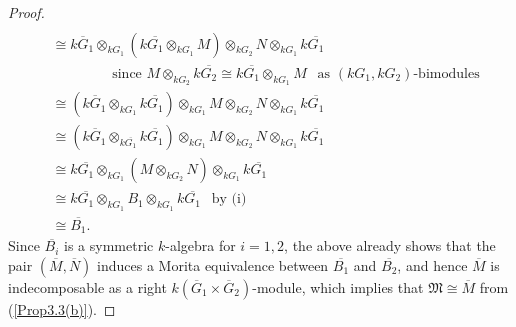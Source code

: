 \documentclass[12pt,a4paper]{amsart}
\theoremstyle{plain}\newtheorem{Theorem}{Theorem}[section]
\theoremstyle{plain}\newtheorem{Conjecture}[Theorem]{Conjecture}
\theoremstyle{plain}\newtheorem{Corollary}[Theorem]{Corollary}
\theoremstyle{plain}\newtheorem{Lemma}[Theorem]{Lemma}
\theoremstyle{plain}\newtheorem{Proposition}[Theorem]{Proposition}
\theoremstyle{definition}\newtheorem{Definition}[Theorem]{Definition}
\theoremstyle{definition}\newtheorem{Example}[Theorem]{Example}
\theoremstyle{definition}\newtheorem{Examples}[Theorem]{Examples}
\theoremstyle{definition}\newtheorem{Remark}[Theorem]{Remark}
\theoremstyle{definition}\newtheorem{Question}[Theorem]{Question}
\theoremstyle{definition}\newtheorem{Notation}[Theorem]{Notation}
\theoremstyle{definition}\newtheorem{Hypothesis}[Theorem]{Hypothesis}
\theoremstyle{definition}\newtheorem{Assumption}[Theorem]{Assumption}
\theoremstyle{definition}\newtheorem{Strategy}[Theorem]{Strategy}
\theoremstyle{definition}\newtheorem{Contents}[Theorem]{Contents}
\theoremstyle{definition}\newtheorem{Computations}[Theorem]{Computations}
\theoremstyle{definition}\newtheorem{Equivalences}[Theorem]{Equivalences}
\theoremstyle{definition}\newtheorem{Notation/Definition}[Theorem]{Notation/Definition}
\theoremstyle{definition}\newtheorem{noth}[Theorem]{}
\theoremstyle{plain}\newtheorem{Step}[Theorem]{Step}
\begin{document}
\begin{proof}
\begin{align*}
\\&\cong
k{\overline G_1}\otimes_{kG_1}(k\overline{G_1}\otimes_{kG_1}M)\otimes_{kG_2}N\otimes_{kG_1}k\overline{G_1}
\\& \qquad\qquad
\text{ since } M\otimes_{kG_2}k\overline{G_2}\cong k\overline{G_1}\otimes_{kG_1}M \ \ 
\text{ as }(kG_1,kG_2)\text{-bimodules}
\\&\cong
(k{\overline G_1}\otimes_{kG_1}k\overline{G_1})\otimes_{kG_1}M\otimes_{kG_2}N\otimes_{kG_1}k\overline{G_1}
\\&\cong
(k{\overline G_1}\otimes_{k\overline{G_1}}k\overline{G_1})
                   \otimes_{kG_1}M\otimes_{kG_2}N\otimes_{kG_1}k\overline{G_1}
\\&\cong
k\overline{G_1}\otimes_{kG_1}(M\otimes_{kG_2}N)\otimes_{kG_1}k\overline{G_1}
\\&\cong
k\overline{G_1}\otimes_{kG_1}B_1\otimes_{kG_1}k\overline{G_1}\ \ \text{ by (i)}
\\&\cong
\overline{B_1}.
\end{align*}
Since $\overline{B_i}$ is a symmetric $k$-algebra for $i=1, 2$, the above already shows that
the pair $(\overline M, {\overline N})$ induces a Morita equivalence between
$\overline{B_1}$ and $\overline{B_2}$,
and hence $\overline M$ is indecomposable as a right
$k(\overline G_1\times\overline G_2)$-module,
which implies that $\mathfrak M\cong\overline M$
from (\ref{Prop3.3(b)}).
\medskip
%


\end{proof}
\end{document}
